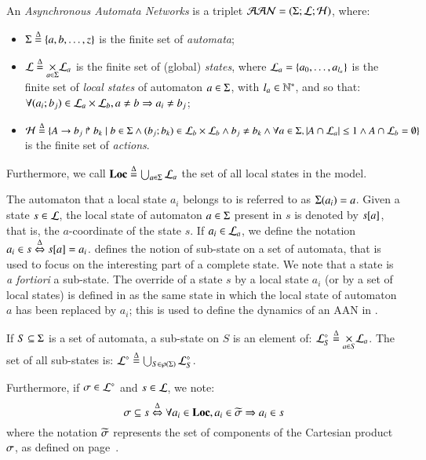\begin{definition}
\label{def:ph}
  An \emph{Asynchronous Automata Networks} is a triplet $\PH = (\PHs; \PHl; \PHa)$,
  where:
  \begin{itemize}
    \item $\PHs \DEF \{a, b, \dots, z\}$ is the finite set of \emph{automata};
    \item $\PHl \DEF \underset{a \in \PHs}{\times} \PHl_a$ is the finite set of
      (global) \emph{states},
      where $\PHl_a = \{a_0, \ldots, a_{l_a}\}$ is the finite set of \emph{local states}
      of automaton $a \in \PHs$, with $l_a \in \sN^*$,
      and so that:
      $\forall (a_i; b_j) \in \PHl_a \times \PHl_b, a \neq b \Rightarrow a_i \neq b_j$;
    \item $\PHa \DEF \{\PHfrappe{A}{b_j}{b_k} \mid
      b \in \PHs \wedge (b_j; b_k) \in \PHl_b \times \PHl_b \wedge
      b_j \neq b_k \wedge
      \forall a \in \PHs, \card{A \cap \PHl_a} \leq 1 \wedge
      A \cap \PHl_b = \emptyset \}$ is the finite set of \emph{actions}.
  \end{itemize}
  Furthermore,
  we call $\PHproc \DEF \bigcup_{a \in \PHs} \PHl_a$ the set of all local states in the model.
\end{definition}
%
\noindent
The automaton that a local state $a_i$ belongs to is referred to as $\PHsort(a_i) = a$.
Given a state $s\in \PHl$, the local state of automaton $a \in \PHs$ present in $s$ is denoted by $\PHget{s}{a}$, that is, the $a$-coordinate of the state $s$.
If $a_i \in \PHl_a$, we define the notation $a_i \in s \EQDEF \PHget{s}{a} = a_i$.
 defines the notion of sub-state on a set of automata, that is used to focus on the interesting part of a complete state.
We note that a state is \textit{a fortiori} a sub-state.
The override of a state $s$ by a local state $a_i$ (or by a set of local states)
is defined in  as the same state in which the local state of automaton $a$ has been replaced by $a_i$;
this is used to define the dynamics of an AAN in .
%
\begin{definition}
\label{def:substate}
  If $S \subseteq \PHs$ is a set of automata, a sub-state on $S$ is an element of:
  $\PHsubl[\PHl]_S \DEF \bigtimes{a \in S} \PHl_a$.
  The set of all sub-states is:
  $\PHsubl[\PHl] \DEF \bigcup_{S \in\powerset(\PHs)} \PHsubl[\PHl]_S$.
  
  \noindent
  Furthermore, if $\mysigma \in \PHsubl[\PHl]$ and $s \in \PHl$, we note:
    \[\mysigma \subseteq s \EQDEF \forall a_i \in \Proc, a_i \in \toset{\mysigma} \Rightarrow a_i \in s\]
  where the notation $\toset{\mysigma}$ represents
  the set of components of the Cartesian product $\mysigma$,
  as defined on page~\pageref{notations}.
\end{definition}

